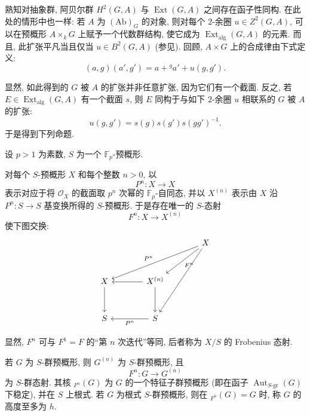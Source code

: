 熟知对抽象群, 阿贝尔群 \(H^2(G,A)\) 与 \(\operatorname{Ext}(G,A)\)
之间存在函子性同构.
在此处的情形中也一样: 若 \(A\) 为 \((\mathrm{Ab})_G\) 的对象,
则对每个 \(2\)-余圈 \(u\in Z^2(G,A)\),
可以在预概形 \(A\times_kG\) 上赋予一个代数群结构,
使它成为 \(\operatorname{Ext}_{\mathrm{alg}}(G,A)\) 的元素.
而且, 此扩张平凡当且仅当 \(u\in B^2(G,A)\)
(参见).
回顾, \(A\times G\) 上的合成律由下式定义:
\[
  (a,g)(a',g')=a+{}^g a'+u(g,g').
\]

显然, 如此得到的 \(G\) 被 \(A\) 的扩张并非任意扩张, 因为它们有一个截面.
反之, 若 \(E\in\operatorname{Ext}_{\mathrm{alg}}(G,A)\) 有一个截面 \(s\),
则 \(E\) 同构于与如下 \(2\)-余圈 \(u\) 相联系的 \(G\) 被 \(A\) 的扩张:
\[
  u(g,g')=s(g)s(g')s(gg')^{-1}.
\]
于是得到下列命题.



设 \(p>1\) 为素数, \(S\) 为一个 \(\mathbb F_p\)-预概形.


对每个 \(S\)-预概形 \(X\) 和每个整数 \(n>0\), 以
\[
  P^n:X\longrightarrow X
\]
表示对应于将 \(\mathcal O_X\) 的截面取 \(p^n\) 次幂的 \(\mathbb F_p\)-自同态,
并以 \(X^{(n)}\) 表示由 \(X\) 沿 \(P^n:S\to S\) 基变换所得的 \(S\)-预概形.
于是存在唯一的 \(S\)-态射
\[
  F^n:X\longrightarrow X^{(n)}
\]
使下图交换:
\[
\begin{tikzcd}[column sep=3.7em,row sep=3.0em]
  {} & {} & X
    \arrow[dll,"P^n"']
    \arrow[dl,"F^n"]
    \arrow[ddl] \\
  X \arrow[d] &
  X^{(n)} \arrow[l] \arrow[d] &
  {} \\
  S &
  S \arrow[l,"P^n"] &
  {}
\end{tikzcd}
\]

显然, \(F^n\) 可与 \(F^1=F\) 的“第 \(n\) 次迭代”等同,
后者称为 \(X/S\) 的 Frobenius 态射.

若 \(G\) 为 \(S\)-群预概形, 则 \(G^{(n)}\) 为 \(S\)-群预概形, 且
\[
  F^n:G\longrightarrow G^{(n)}
\]
为 \(S\)-群态射.
其核 \({}_{F^n}(G)\) 为 \(G\) 的一个特征子群预概形
(即在函子 \(\operatorname{Aut}_{S\text{-}\mathrm{gr}}(G)\) 下稳定),
并在 \(S\) 上根式.
若 \(G\) 为根式 \(S\)-群预概形, 则在 \({}_{F^h}(G)=G\) 时,
称 \(G\) 的高度至多为 \(h\).

